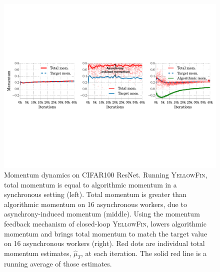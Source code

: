 \documentclass{article}
\newcommand{\tuner}{\textsc{YellowFin}\xspace}
\newcommand{\asynctuner}{closed-loop \textsc{YellowFin}\xspace}
\begin{document}
\label{subsec:closed_loop_YF}
\begin{figure}
\centering
\includegraphics[width=0.95\linewidth]{experiment_results/resnet/mom_dynamic_3.pdf}
	\caption{
	Momentum dynamics on CIFAR100 ResNet.
	Running \tuner, total momentum is equal to algorithmic momentum in a synchronous setting (left). Total momentum is greater than algorithmic momentum on 16 asynchronous workers, due to asynchrony-induced momentum (middle).
	Using the momentum feedback mechanism of \asynctuner, lowers algorithmic momentum and brings total momentum to match the target value on 16 asynchronous workers (right).
	Red dots are individual total momentum estimates, $\hat{\mu}_T$, at each iteration. 
The solid red line is a running average of those estimates.	
	}
	\label{fig:we-can-measure}
\end{figure}
\end{document}
